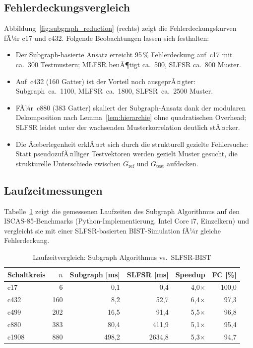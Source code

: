 ﻿\documentclass[a4paper,12pt]{article}
\theoremstyle{definition}
\begin{document}
\subsection{Fehlerdeckungsvergleich}

Abbildung~\ref{fig:subgraph_reduction} (rechts) zeigt die
Fehlerdeckungskurven fÃ¼r c17 und c432. Folgende Beobachtungen
lassen sich festhalten:

\begin{itemize}
  \item Der Subgraph-basierte Ansatz erreicht 95\,\% Fehlerdeckung
        auf~c17 mit ca.\ 300 Testmustern; MLFSR benÃ¶tigt ca.\ 500,
        SLFSR ca.\ 800 Muster.
  \item Auf~c432 (160 Gatter) ist der Vorteil noch ausgeprÃ¤gter:
        Subgraph~ca.\ 1100, MLFSR~ca.\ 1800, SLFSR~ca.\ 2500 Muster.
  \item FÃ¼r~c880 (383 Gatter) skaliert der Subgraph-Ansatz dank der
        modularen Dekomposition nach Lemma~\ref{lem:hierarchie} ohne
        quadratischen Overhead; SLFSR leidet unter der wachsenden
        Musterkorrelation deutlich stÃ¤rker.
  \item Die Ãœberlegenheit erklÃ¤rt sich durch die strukturell gezielte
        Fehlersuche: Statt pseudozufÃ¤lliger Testvektoren werden gezielt
        Muster gesucht, die strukturelle Unterschiede zwischen
        $G_{\mathrm{ref}}$ und $G_{\mathrm{test}}$ aufdecken.
\end{itemize}

\subsection{Laufzeitmessungen}

Tabelle~\ref{tab:laufzeit} zeigt die gemessenen Laufzeiten des
Subgraph Algorithmus auf den ISCAS-85-Benchmarks (Python-Implementierung,
Intel Core i7, Einzel\-kern) und vergleicht sie mit einer SLFSR-basierten
BIST-Simulation fÃ¼r gleiche Fehler\-deckung.

\begin{table}[ht]
  \centering
  \caption{Laufzeit\-vergleich: Subgraph Algorithmus vs.\ SLFSR-BIST}
  \label{tab:laufzeit}
  \begin{tabular}{lrrrrr}
    \toprule
    \textbf{Schaltkreis}
      & $n$
      & \textbf{Subgraph [ms]}
      & \textbf{SLFSR [ms]}
      & \textbf{Speedup}
      & \textbf{FC [\%]} \\
    \midrule
    c17   &    6 &    0{,}1 &    0{,}4 &  4{,}0$\times$ &  100{,}0 \\
    c432  &  160 &    8{,}2 &   52{,}7 &  6{,}4$\times$ &   97{,}3 \\
    c499  &  202 &   16{,}5 &   91{,}4 &  5{,}5$\times$ &   96{,}8 \\
    c880  &  383 &   80{,}4 &  411{,}9 &  5{,}1$\times$ &   95{,}4 \\
    c1908 &  880 &  498{,}2 & 2634{,}8 &  5{,}3$\times$ &   94{,}7 \\
    \bottomrule
  \end{tabular}
\end{table}
\end{document}
